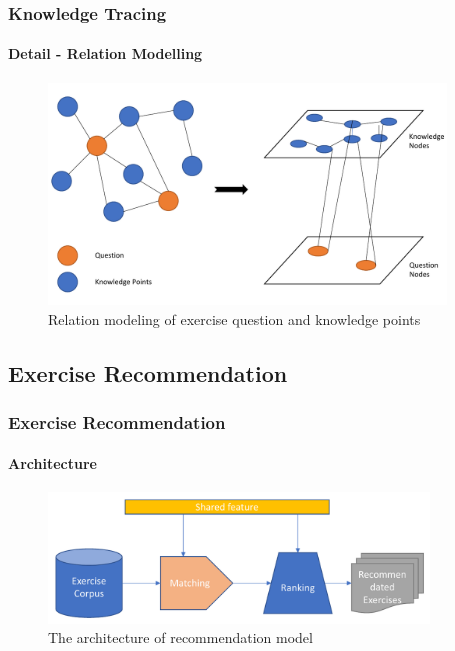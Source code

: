 \documentclass{beamer}
\begin{document}
\begin{frame}
  \frametitle{Knowledge Tracing}
  \framesubtitle{Detail - Relation Modelling}
  \begin{figure}
    \centering
    \includegraphics[width=0.94\textwidth]{figures/ch3-gat-kq.pdf}
    \caption{Relation modeling of exercise question and knowledge points}
  \end{figure}
\end{frame}







\subsection{Exercise Recommendation}
\begin{frame}
  \frametitle{Exercise Recommendation}
  \framesubtitle{Architecture}
  \begin{figure}
    \includegraphics[width=0.9\textwidth]{figures/ch4-ov.pdf}
    \caption{The architecture of recommendation model}
  \end{figure}
\end{frame}
\end{document}
